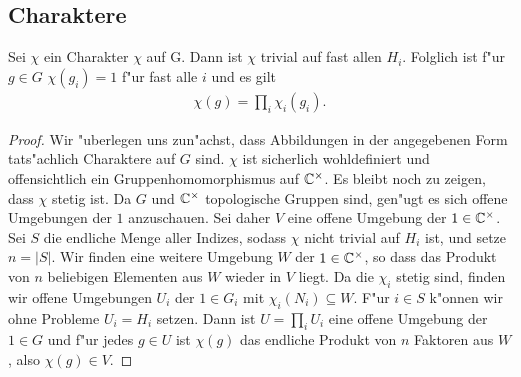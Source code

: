 	\subsection{Charaktere}%
		\begin{lemma}
			Sei $\chi$  ein Charakter $\chi$ auf G. Dann ist $\chi$ trivial auf fast allen $H_i$. Folglich ist f"ur $g\in G$ $\chi(g_i) = 1$ f"ur fast alle $i$ und es gilt
			\begin{align*}
				\chi(g) = \prod_i \chi_i(g_i).
			\end{align*}
		\end{lemma}
		\begin{proof}
			Wir "uberlegen uns zun"achst, dass Abbildungen in der angegebenen Form tats"achlich Charaktere auf $G$ sind. 
			$\chi$ ist sicherlich wohldefiniert und offensichtlich ein Gruppenhomomorphismus auf $\mathbb{C}^\times$. 
			Es bleibt noch zu zeigen, dass $\chi$ stetig ist. 
			Da $G$ und $\mathbb{C}^\times$ topologische Gruppen sind, gen"ugt es sich offene Umgebungen der $1$ anzuschauen. Sei daher $V$ eine offene Umgebung der $1 \in \mathbb{C}^\times$.
			Sei $S$ die endliche Menge aller Indizes, sodass $\chi$ nicht trivial auf $H_i$ ist, und setze $n = |S|$. 
			Wir finden eine weitere Umgebung $W$ der $1 \in \mathbb{C}^\times$, so dass das Produkt von $n$ beliebigen Elementen aus $W$ wieder in $V$ liegt. 
			Da die $\chi_i$ stetig sind, finden wir offene Umgebungen $U_i$ der $1 \in G_i$ mit $\chi_i(N_i) \subseteq W$. 
			F"ur $i \in S$ k"onnen wir ohne Probleme $U_i = H_i$ setzen. 
			Dann ist $U = \prod_i U_i$ eine offene Umgebung der $1 \in G$ und f"ur jedes $g \in U$ ist $\chi(g)$ das endliche Produkt von $n$ Faktoren aus $W$, also $\chi(g) \in V$.
			

\end{proof}
